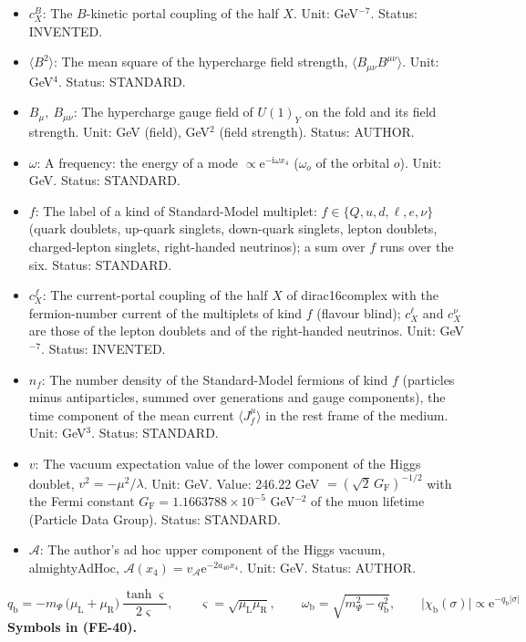 \documentclass[
  10pt,
]{article}
\begin{document}
\begin{itemize}
  (field), GeV\(^2\) (field strength). Status: AUTHOR.
\item
  \(c^{B}_X\): The \(B\)-kinetic portal coupling of the half \(X\).
  Unit: GeV\(^{-7}\). Status: INVENTED.
\item
  \(\langle B^2\rangle\): The mean square of the hypercharge field
  strength, \(\langle B_{\mu\nu}B^{\mu\nu}\rangle\). Unit: GeV\(^4\).
  Status: STANDARD.
\item
  \(B_\mu,\ B_{\mu\nu}\): The hypercharge gauge field of \(U(1)_Y\) on
  the fold and its field strength. Unit: GeV (field), GeV\(^2\) (field
  strength). Status: AUTHOR.
\item
  \(\omega\): A frequency: the energy of a mode
  \(\propto \mathrm{e}^{-\mathrm{i}\omega x_4}\) (\(\omega_o\) of the
  orbital \(o\)). Unit: GeV. Status: STANDARD.
\item
  \(f\): The label of a kind of Standard-Model multiplet:
  \(f \in \{Q, u, d, \ell, e, \nu\}\) (quark doublets, up-quark
  singlets, down-quark singlets, lepton doublets, charged-lepton
  singlets, right-handed neutrinos); a sum over \(f\) runs over the six.
  Status: STANDARD.
\item
  \(c^{f}_X\): The current-portal coupling of the half \(X\) of
  dirac16complex with the fermion-number current of the multiplets of
  kind \(f\) (flavour blind); \(c^{\ell}_X\) and \(c^{\nu}_X\) are those
  of the lepton doublets and of the right-handed neutrinos. Unit:
  GeV\(^{-7}\). Status: INVENTED.
\item
  \(n_f\): The number density of the Standard-Model fermions of kind
  \(f\) (particles minus antiparticles, summed over generations and
  gauge components), the time component of the mean current
  \(\langle J_f^\mu\rangle\) in the rest frame of the medium. Unit:
  GeV\(^3\). Status: STANDARD.
\item
  \(v\): The vacuum expectation value of the lower component of the
  Higgs doublet, \(v^2 = -\mu^2/\lambda\). Unit: GeV. Value: 246.22 GeV
  \(= (\sqrt2\,G_{\mathrm{F}})^{-1/2}\) with the Fermi constant
  \(G_{\mathrm{F}} = 1.1663788\times10^{-5}\) GeV\(^{-2}\) of the muon
  lifetime (Particle Data Group). Status: STANDARD.
\item
  \(\mathcal{A}\): The author's ad hoc upper component of the Higgs
  vacuum, almightyAdHoc,
  \(\mathcal{A}(x_4) = v_{\mathcal{A}}\mathrm{e}^{-2a_{40}x_4}\). Unit:
  GeV. Status: AUTHOR.
\end{itemize}

\[
q_{\mathrm{b}} = -m_\Psi\,\big(\mu_{\mathrm{L}} + \mu_{\mathrm{R}}\big)\,\frac{\tanh\varsigma}{2\varsigma},\qquad \varsigma = \sqrt{\mu_{\mathrm{L}}\mu_{\mathrm{R}}},\qquad
\omega_{\mathrm{b}} = \sqrt{m_\Psi^2 - q_{\mathrm{b}}^2},\qquad \lvert\chi_{\mathrm{b}}(\sigma)\rvert \propto \mathrm{e}^{-q_{\mathrm{b}}\lvert\sigma\rvert} \tag{FE-40}
\] \textbf{Symbols in (FE-40).}
\end{document}
